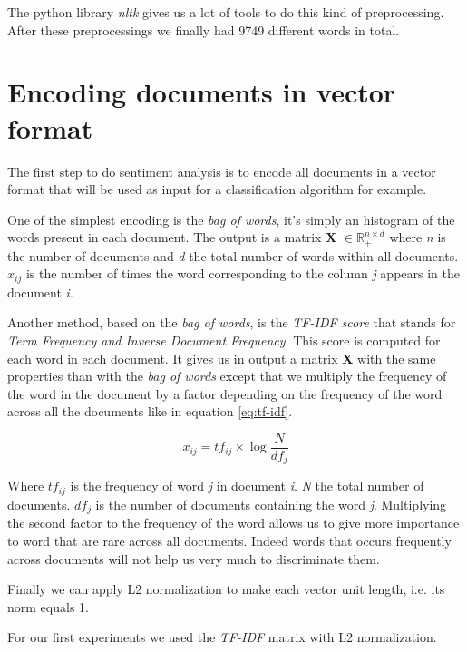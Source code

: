 \documentclass{article}
\begin{document}
The python library \textit{nltk} gives us a lot of tools to do this kind of preprocessing. After these preprocessings we finally had 9749 different words in total.



\section{Encoding documents in vector format}

The first step to do sentiment analysis is to encode all documents in a vector format that will be used as input for a classification algorithm for example. 

One of the simplest encoding is the \textit{bag of words}, it's simply an histogram of the words present in each document. The output is a matrix \textbf{X} $\in \mathbb{R}^{n \times d}_{+}$ where \textit{n} is the number of documents and \textit{d} the total number of words within all documents. $x_{ij}$ is the number of times the word corresponding to the column \textit{j} appears in the document \textit{i}.

Another method, based on the \textit{bag of words}, is the \textit{TF-IDF score} that stands for \textit{Term Frequency and Inverse Document Frequency}. This score is computed for each word in each document. It gives us in output a matrix \textbf{X} with the same properties than with the \textit{bag of words} except that we multiply the frequency of the word in the document by a factor depending on the frequency of the word across all the documents like in equation \ref{eq:tf-idf}. 

\begin{equation} \label{eq:tf-idf}
x_{ij} = tf_{ij} \times \log\frac{N}{df_{j}}
\end{equation}

Where $tf_{ij}$ is the frequency of word \textit{j} in document \textit{i}. \textit{N} the total number of documents. $df_{j}$ is the number of documents containing the word \textit{j}. Multiplying the second factor to the frequency of the word allows us to give more importance to word that are rare across all documents. Indeed words that occurs frequently across documents will not help us very much to discriminate them.

Finally we can apply L2 normalization to make each vector unit length, i.e. its norm equals 1. 

For our first experiments we used the \textit{TF-IDF} matrix with L2 normalization.
\end{document}
